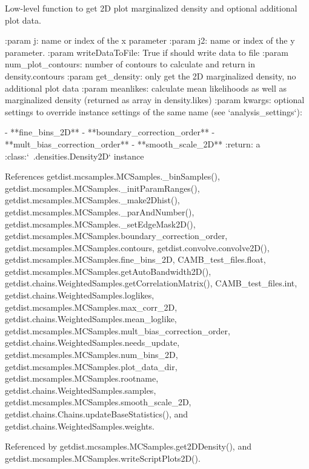 \begin{DoxyVerb}Low-level function to get 2D plot marginalized density and optional additional plot data.

:param j: name or index of the x parameter
:param j2: name or index of the y parameter.
:param writeDataToFile: True if should write data to file
:param num_plot_contours: number of contours to calculate and return in density.contours
:param get_density: only get the 2D marginalized density, no additional plot data
:param meanlikes: calculate mean likelihoods as well as marginalized density (returned as array in density.likes)
:param kwargs: optional settings to override instance settings of the same name (see `analysis_settings`):

    - **fine_bins_2D**
    - **boundary_correction_order**
    - **mult_bias_correction_order**
    - **smooth_scale_2D**
:return: a :class:`~.densities.Density2D` instance
\end{DoxyVerb}
 

References getdist.\+mcsamples.\+M\+C\+Samples.\+\_\+bin\+Samples(), getdist.\+mcsamples.\+M\+C\+Samples.\+\_\+init\+Param\+Ranges(), getdist.\+mcsamples.\+M\+C\+Samples.\+\_\+make2\+Dhist(), getdist.\+mcsamples.\+M\+C\+Samples.\+\_\+par\+And\+Number(), getdist.\+mcsamples.\+M\+C\+Samples.\+\_\+set\+Edge\+Mask2\+D(), getdist.\+mcsamples.\+M\+C\+Samples.\+boundary\+\_\+correction\+\_\+order, getdist.\+mcsamples.\+M\+C\+Samples.\+contours, getdist.\+convolve.\+convolve2\+D(), getdist.\+mcsamples.\+M\+C\+Samples.\+fine\+\_\+bins\+\_\+2D, C\+A\+M\+B\+\_\+test\+\_\+files.\+float, getdist.\+mcsamples.\+M\+C\+Samples.\+get\+Auto\+Bandwidth2\+D(), getdist.\+chains.\+Weighted\+Samples.\+get\+Correlation\+Matrix(), C\+A\+M\+B\+\_\+test\+\_\+files.\+int, getdist.\+chains.\+Weighted\+Samples.\+loglikes, getdist.\+mcsamples.\+M\+C\+Samples.\+max\+\_\+corr\+\_\+2D, getdist.\+chains.\+Weighted\+Samples.\+mean\+\_\+loglike, getdist.\+mcsamples.\+M\+C\+Samples.\+mult\+\_\+bias\+\_\+correction\+\_\+order, getdist.\+chains.\+Weighted\+Samples.\+needs\+\_\+update, getdist.\+mcsamples.\+M\+C\+Samples.\+num\+\_\+bins\+\_\+2D, getdist.\+mcsamples.\+M\+C\+Samples.\+plot\+\_\+data\+\_\+dir, getdist.\+mcsamples.\+M\+C\+Samples.\+rootname, getdist.\+chains.\+Weighted\+Samples.\+samples, getdist.\+mcsamples.\+M\+C\+Samples.\+smooth\+\_\+scale\+\_\+2D, getdist.\+chains.\+Chains.\+update\+Base\+Statistics(), and getdist.\+chains.\+Weighted\+Samples.\+weights.



Referenced by getdist.\+mcsamples.\+M\+C\+Samples.\+get2\+D\+Density(), and getdist.\+mcsamples.\+M\+C\+Samples.\+write\+Script\+Plots2\+D().


